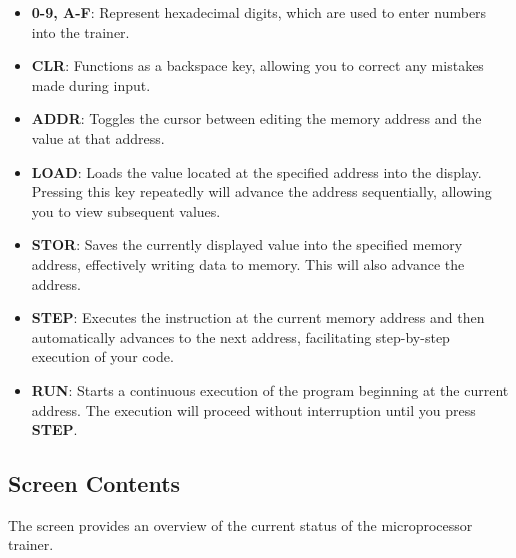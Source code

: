 \documentclass[12pt]{article}
\begin{document}
\begin{itemize}
    \item \textbf{0-9, A-F}: Represent hexadecimal digits, which are used to enter numbers into the trainer.
    \item \textbf{CLR}: Functions as a backspace key, allowing you to correct any mistakes made during input.
    \item \textbf{ADDR}: Toggles the cursor between editing the memory address and the value at that address.
    \item \textbf{LOAD}: Loads the value located at the specified address into the display. Pressing this key repeatedly will advance the address sequentially, allowing you to view subsequent values.
    \item \textbf{STOR}: Saves the currently displayed value into the specified memory address, effectively writing data to memory. This will also advance the address.
    \item \textbf{STEP}: Executes the instruction at the current memory address and then automatically advances to the next address, facilitating step-by-step execution of your code.
    \item \textbf{RUN}: Starts a continuous execution of the program beginning at the current address. The execution will proceed without interruption until you press \textbf{STEP}.
\end{itemize}

\subsection{Screen Contents}

The screen provides an overview of the current status of the microprocessor trainer.
\end{document}
